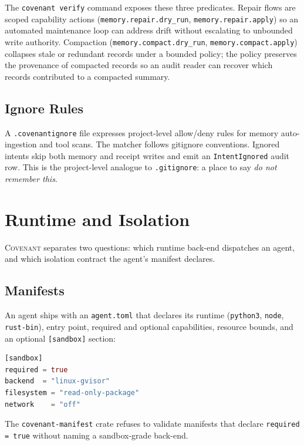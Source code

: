\documentclass[11pt]{article}
\theoremstyle{plainsmall}
\begin{document}
The \texttt{covenant verify} command exposes these three predicates. Repair flows are scoped capability actions (\texttt{memory.repair.dry\_run}, \texttt{memory.repair.apply}) so an automated maintenance loop can address drift without escalating to unbounded write authority. Compaction (\texttt{memory.compact.dry\_run}, \texttt{memory.compact.apply}) collapses stale or redundant records under a bounded policy; the policy preserves the provenance of compacted records so an audit reader can recover which records contributed to a compacted summary.

\subsection{Ignore Rules}

A \texttt{.covenantignore} file expresses project-level allow/deny rules for memory auto-ingestion and tool scans. The matcher follows gitignore conventions. Ignored intents skip both memory and receipt writes and emit an \texttt{IntentIgnored} audit row. This is the project-level analogue to \texttt{.gitignore}: a place to say \emph{do not remember this}.

\section{Runtime and Isolation}
\label{sec:runtime}

\textsc{Covenant} separates two questions: which runtime back-end dispatches an agent, and which isolation contract the agent's manifest declares.

\subsection{Manifests}

An agent ships with an \texttt{agent.toml} that declares its runtime (\texttt{python3}, \texttt{node}, \texttt{rust-bin}), entry point, required and optional capabilities, resource bounds, and an optional \texttt{[sandbox]} section:

\begin{lstlisting}[language=rs]
[sandbox]
required = true
backend  = "linux-gvisor"
filesystem = "read-only-package"
network    = "off"
\end{lstlisting}

The \texttt{covenant-manifest} crate refuses to validate manifests that declare \texttt{required = true} without naming a sandbox-grade back-end.
\end{document}
